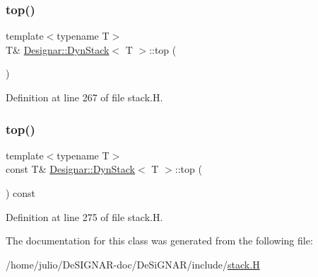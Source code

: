 \subsubsection{\texorpdfstring{top()}{top()}\hspace{0.1cm}{\footnotesize\ttfamily [1/2]}}
{\footnotesize\ttfamily template$<$typename T$>$ \\
T\& \hyperlink{class_designar_1_1_dyn_stack}{Designar\+::\+Dyn\+Stack}$<$ T $>$\+::top (\begin{DoxyParamCaption}{ }\end{DoxyParamCaption})\hspace{0.3cm}{\ttfamily [inline]}}



Definition at line 267 of file stack.\+H.

\mbox{\label{class_designar_1_1_dyn_stack_a497eb06d2cb8280d031586a913b1317c}} 
\subsubsection{\texorpdfstring{top()}{top()}\hspace{0.1cm}{\footnotesize\ttfamily [2/2]}}
{\footnotesize\ttfamily template$<$typename T$>$ \\
const T\& \hyperlink{class_designar_1_1_dyn_stack}{Designar\+::\+Dyn\+Stack}$<$ T $>$\+::top (\begin{DoxyParamCaption}{ }\end{DoxyParamCaption}) const\hspace{0.3cm}{\ttfamily [inline]}}



Definition at line 275 of file stack.\+H.



The documentation for this class was generated from the following file\+:\begin{DoxyCompactItemize}
\item 
/home/julio/\+De\+S\+I\+G\+N\+A\+R-\/doc/\+De\+Si\+G\+N\+A\+R/include/\hyperlink{stack_8_h}{stack.\+H}\end{DoxyCompactItemize}

